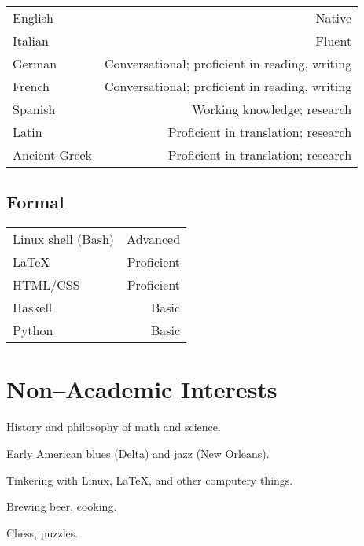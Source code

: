 \documentclass[letterpaper]{article}
\makeatletter
\newcommand{\myvrule}{\color{lightgray}\vrule width 1.0pt}
\newenvironment{cvsection}{%
  \vspace{-3ex}
  \renewcommand{\arraystretch}{1.5}
  \begin{longtable}{@{} L R @{}}
}{%
  \end{longtable}
  \vspace{1ex}
  \renewcommand{\arraystretch}{1.0}
}
\makeatother
\begin{document}
\begin{cvsection}
  English & Native \\
  Italian & Fluent \\
  German & Conversational; proficient in reading, writing \\
  French & Conversational; proficient in reading, writing \\
  Spanish & Working knowledge; research \\
  Latin & Proficient in translation; research \\
  Ancient Greek & Proficient in translation; research \\
\end{cvsection}

\subsection*{Formal}

\begin{cvsection}
  Linux shell {\small (Bash)} & Advanced \\
  \LaTeX{} & Proficient \\
  HTML/CSS & Proficient \\
  Haskell & Basic \\
  Python & Basic
\end{cvsection}



\section*{Non--Academic Interests}

\begin{list}{}{\leftmargin=0pt}
  \item History and philosophy of math and science.
  \item Early American blues (Delta) and jazz (New Orleans).
  \item Tinkering with Linux, \LaTeX{}, and other computery things.
  \item Brewing beer, cooking.
  \item Chess, puzzles.
\end{list}
\end{document}
